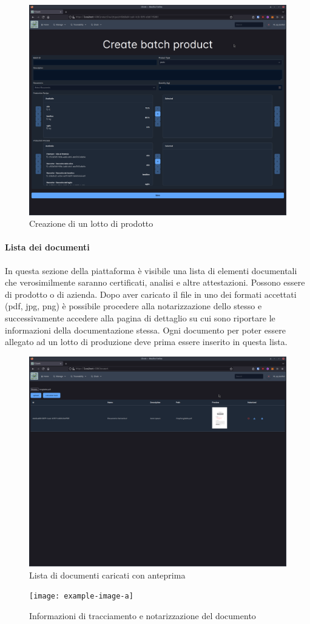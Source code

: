\documentclass[a4paper,11pt]{article}
\begin{document}
\begin{figure}[H]
  \centering
  \includegraphics[width=0.5\linewidth]{screenIotChain/0010.png}
  \caption{Creazione di un lotto di prodotto}
  \label{fig:screen10}
\end{figure}


\paragraph{Lista dei documenti}
In questa sezione della piattaforma è visibile una lista di elementi documentali che verosimilmente saranno certificati, analisi e altre attestazioni. Possono essere di prodotto o di azienda. Dopo aver caricato il file in uno dei formati accettati (pdf, jpg, png) è possibile procedere alla notarizzazione dello stesso e successivamente accedere alla pagina di dettaglio su cui sono riportare le informazioni della documentazione stessa. Ogni documento per poter essere allegato ad un lotto di produzione deve prima essere inserito in questa lista.
\begin{figure}[H]
  \centering
  \includegraphics[width=0.5\linewidth]{screenIotChain/0011.png}
  \caption{Lista di documenti caricati con anteprima}
  \label{fig:screen11}
\end{figure}


\begin{figure}[H]
  \centering
  \texttt{[image: example-image-a]}
  \caption{Informazioni di tracciamento e notarizzazione del documento}
  \label{fig:screen11a}
\end{figure}
\end{document}
